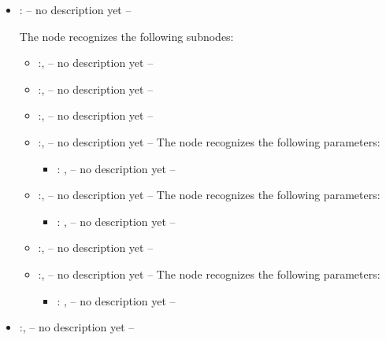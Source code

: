 \begin{itemize}
\begin{itemize}
\begin{itemize}
            \item {}:
              -- no description yet --

              The  node recognizes the following subnodes:
              \begin{itemize}
                \item {}:, 
                  -- no description yet --

                \item {}:, 
                  -- no description yet --

                \item {}:, 
                  -- no description yet --

                \item {}:, 
                  -- no description yet --
                  The  node recognizes the following parameters:
                    \begin{itemize}
                      \item {}: , 
                        -- no description yet --
                  \end{itemize}

                \item {}:, 
                  -- no description yet --
                  The  node recognizes the following parameters:
                    \begin{itemize}
                      \item {}: , 
                        -- no description yet --
                  \end{itemize}

                \item {}:, 
                  -- no description yet --

                \item {}:, 
                  -- no description yet --
                  The  node recognizes the following parameters:
                    \begin{itemize}
                      \item {}: , 
                        -- no description yet --
                  \end{itemize}
              \end{itemize}

            \item {}:, 
              -- no description yet --
          \end{itemize}
      \end{itemize}
  \end{itemize}
